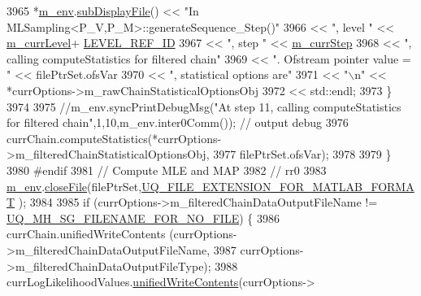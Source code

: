\begin{DoxyCode}
3965         *\hyperlink{class_q_u_e_s_o_1_1_m_l_sampling_a13f1ca4fe9f94822fe572a743eaced1d}{m\_env}.\hyperlink{class_q_u_e_s_o_1_1_base_environment_a8a0064746ae8dddfece4229b9ad374d6}{subDisplayFile}() << \textcolor{stringliteral}{"In MLSampling<P\_V,P\_M>::generateSequence\_Step()"}
3966                                 << \textcolor{stringliteral}{", level "} << \hyperlink{class_q_u_e_s_o_1_1_m_l_sampling_af9416874c856e50f3b35270e801f17e4}{m\_currLevel}+
      \hyperlink{_m_l_sampling_level_options_8h_a68d15eaf394d210effcf584b938206d3}{LEVEL\_REF\_ID}
3967                                 << \textcolor{stringliteral}{", step "}  << \hyperlink{class_q_u_e_s_o_1_1_m_l_sampling_a1b1f8ccb4823bdfa26ec652f0807c63e}{m\_currStep}
3968                                 << \textcolor{stringliteral}{", calling computeStatistics for filtered chain"}
3969                                 << \textcolor{stringliteral}{". Ofstream pointer value = "} << filePtrSet.ofsVar
3970                                 << \textcolor{stringliteral}{", statistical options are"}
3971                                 << \textcolor{stringliteral}{"\(\backslash\)n"} << *currOptions->m\_rawChainStatisticalOptionsObj
3972                                 << std::endl;
3973       \}
3974 
3975       \textcolor{comment}{//m\_env.syncPrintDebugMsg("At step 11, calling computeStatistics for filtered
       chain",1,10,m\_env.inter0Comm()); // output debug}
3976       currChain.computeStatistics(*currOptions->m\_filteredChainStatisticalOptionsObj,
3977                                   filePtrSet.ofsVar);
3978 
3979     \}
3980 \textcolor{preprocessor}{#endif}
3981 \textcolor{preprocessor}{}    \textcolor{comment}{// Compute MLE and MAP}
3982     \textcolor{comment}{// rr0}
3983     \hyperlink{class_q_u_e_s_o_1_1_m_l_sampling_a13f1ca4fe9f94822fe572a743eaced1d}{m\_env}.\hyperlink{class_q_u_e_s_o_1_1_base_environment_ab712bff194ddd91459d4ea8715c77e8b}{closeFile}(filePtrSet,\hyperlink{_defines_8h_ac440026eff7deb1c1eed1eea0e8e36ba}{UQ\_FILE\_EXTENSION\_FOR\_MATLAB\_FORMAT}
      );
3984 
3985     \textcolor{keywordflow}{if} (currOptions->m\_filteredChainDataOutputFileName != 
      \hyperlink{_metropolis_hastings_s_g_options_8h_a75699ceb938d800e2b7f59ede3ea9a31}{UQ\_MH\_SG\_FILENAME\_FOR\_NO\_FILE}) \{
3986       currChain.unifiedWriteContents              (currOptions->m\_filteredChainDataOutputFileName,
3987                                                    currOptions->m\_filteredChainDataOutputFileType);
3988       currLogLikelihoodValues.\hyperlink{class_q_u_e_s_o_1_1_scalar_sequence_a2f832dd5eda37df06eb52650ab8ce733}{unifiedWriteContents}(currOptions->

\end{DoxyCode}
